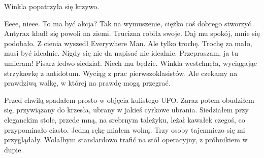 Winkla popatrzyła się krzywo.
\begin{dialogue}
\ds{} Eeee, nieee. To ma być akcja? 
\ds{} Tak na wymuszenie, ciężko coś dobrego stworzyć. \dm{} Antyrax kładł się powoli na ziemi. Trucizna robiła swoje.
\ds{} Daj mu spokój, mnie się podobało. \dm{} Z cienia wyszedł Everywhere Man. \dm{} Ale tylko trochę.
\ds{} Trochę za mało, musi być idealnie.
\ds{} Nigdy się nie da napisać nic idealnie.
\ds{} Przepraszam, ja tu umieram! \dm{} Pisarz ledwo siedział.
\ds{} Niech mu będzie. \dm{} Winkla westchnęła, wyciągając strzykawkę z antidotum. Wyciąg z prac pierwszoklasistów. \dm{} Ale czekamy na prawdziwą walkę, w której na prawdę mogą przegrać.
\end{dialogue}

\divider{}

Przed chwilą spadałem prosto w objęcia kulistego UFO. Zaraz potem obudziłem się, przywiązany do krzesła, ubrany w jakieś cyrkowe ubrania.
Siedziałem przy eleganckim stole, przede mną, na srebrnym tależyku, leżał kawałek czegoś, co przypominało ciasto. Jedną rękę miałem wolną.
Trzy osoby tajemniczo się mi przyglądały. Wolałbym standardowo trafić na stół operacyjny, z próbnikiem w dupie.

